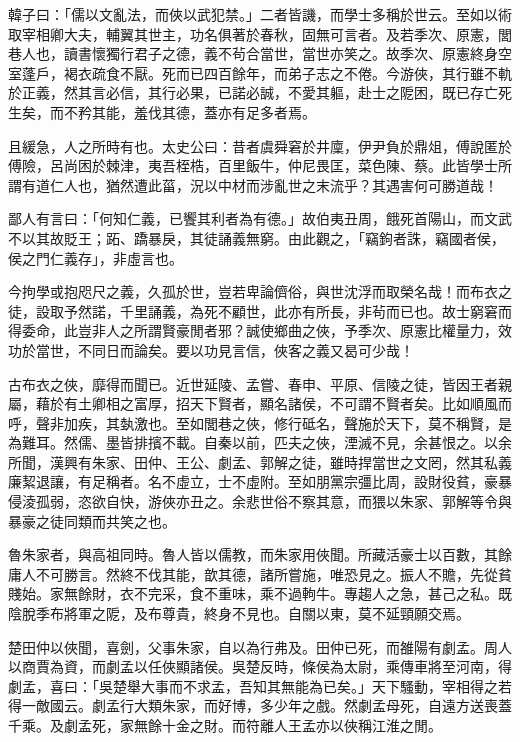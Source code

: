 
\begin{pinyinscope}
韓子曰：「儒以文亂法，而俠以武犯禁。」二者皆譏，而學士多稱於世云。至如以術取宰相卿大夫，輔翼其世主，功名俱著於春秋，固無可言者。及若季次、原憲，閭巷人也，讀書懷獨行君子之德，義不茍合當世，當世亦笑之。故季次、原憲終身空室蓬戶，褐衣疏食不厭。死而已四百餘年，而弟子志之不倦。今游俠，其行雖不軌於正義，然其言必信，其行必果，已諾必誠，不愛其軀，赴士之阸困，既已存亡死生矣，而不矜其能，羞伐其德，蓋亦有足多者焉。

且緩急，人之所時有也。太史公曰：昔者虞舜窘於井廩，伊尹負於鼎俎，傅說匿於傅險，呂尚困於棘津，夷吾桎梏，百里飯牛，仲尼畏匡，菜色陳、蔡。此皆學士所謂有道仁人也，猶然遭此菑，況以中材而涉亂世之末流乎？其遇害何可勝道哉！

鄙人有言曰：「何知仁義，已饗其利者為有德。」故伯夷丑周，餓死首陽山，而文武不以其故貶王；跖、蹻暴戾，其徒誦義無窮。由此觀之，「竊鉤者誅，竊國者侯，侯之門仁義存」，非虛言也。

今拘學或抱咫尺之義，久孤於世，豈若卑論儕俗，與世沈浮而取榮名哉！而布衣之徒，設取予然諾，千里誦義，為死不顧世，此亦有所長，非茍而已也。故士窮窘而得委命，此豈非人之所謂賢豪閒者邪？誠使鄉曲之俠，予季次、原憲比權量力，效功於當世，不同日而論矣。要以功見言信，俠客之義又曷可少哉！

古布衣之俠，靡得而聞已。近世延陵、孟嘗、春申、平原、信陵之徒，皆因王者親屬，藉於有土卿相之富厚，招天下賢者，顯名諸侯，不可謂不賢者矣。比如順風而呼，聲非加疾，其埶激也。至如閭巷之俠，修行砥名，聲施於天下，莫不稱賢，是為難耳。然儒、墨皆排擯不載。自秦以前，匹夫之俠，湮滅不見，余甚恨之。以余所聞，漢興有朱家、田仲、王公、劇孟、郭解之徒，雖時捍當世之文罔，然其私義廉絜退讓，有足稱者。名不虛立，士不虛附。至如朋黨宗彊比周，設財役貧，豪暴侵淩孤弱，恣欲自快，游俠亦丑之。余悲世俗不察其意，而猥以朱家、郭解等令與暴豪之徒同類而共笑之也。

魯朱家者，與高祖同時。魯人皆以儒教，而朱家用俠聞。所藏活豪士以百數，其餘庸人不可勝言。然終不伐其能，歆其德，諸所嘗施，唯恐見之。振人不贍，先從貧賤始。家無餘財，衣不完采，食不重味，乘不過軥牛。專趨人之急，甚己之私。既陰脫季布將軍之阸，及布尊貴，終身不見也。自關以東，莫不延頸願交焉。

楚田仲以俠聞，喜劍，父事朱家，自以為行弗及。田仲已死，而雒陽有劇孟。周人以商賈為資，而劇孟以任俠顯諸侯。吳楚反時，條侯為太尉，乘傳車將至河南，得劇孟，喜曰：「吳楚舉大事而不求孟，吾知其無能為已矣。」天下騷動，宰相得之若得一敵國云。劇孟行大類朱家，而好博，多少年之戲。然劇孟母死，自遠方送喪蓋千乘。及劇孟死，家無餘十金之財。而符離人王孟亦以俠稱江淮之閒。


\end{pinyinscope}
